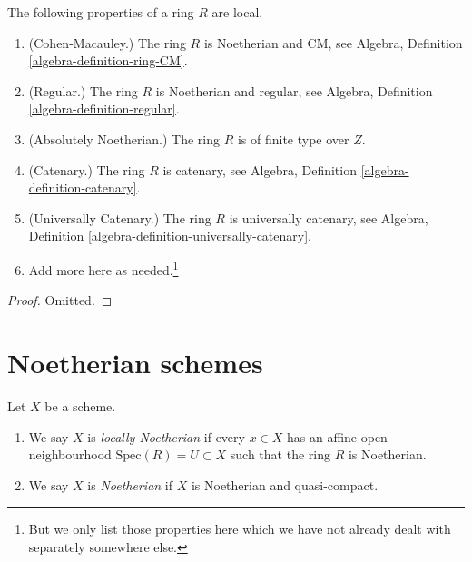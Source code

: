 \begin{lemma}
\label{lemma-properties-local}
The following properties of a ring $R$ are local.
\begin{enumerate}
\item (Cohen-Macauley.)
The ring $R$ is Noetherian and CM, see
Algebra, Definition \ref{algebra-definition-ring-CM}.
\item (Regular.)
The ring $R$ is Noetherian and regular, see
Algebra, Definition \ref{algebra-definition-regular}.
\item (Absolutely Noetherian.)
The ring $R$ is of finite type over $Z$.
\item (Catenary.)
The ring $R$ is catenary, see
Algebra, Definition \ref{algebra-definition-catenary}.
\item (Universally Catenary.)
The ring $R$ is universally catenary, see
Algebra, Definition \ref{algebra-definition-universally-catenary}.
\item Add more here as needed.\footnote{But we only list those properties
here which we have not already dealt with separately somewhere else.}
\end{enumerate}
\end{lemma}

\begin{proof}
Omitted.
\end{proof}















\section{Noetherian schemes}
\label{section-noetherian}

\begin{definition}
\label{definition-noetherian}
Let $X$ be a scheme.
\begin{enumerate}
\item We say $X$ is {\it locally Noetherian} if every
$x \in X$ has an affine open neighbourhood
$\text{Spec}(R) = U \subset X$ such that the ring $R$ is Noetherian.
\item We say $X$ is {\it Noetherian} if $X$ is Noetherian
and quasi-compact.
\end{enumerate}
\end{definition}

